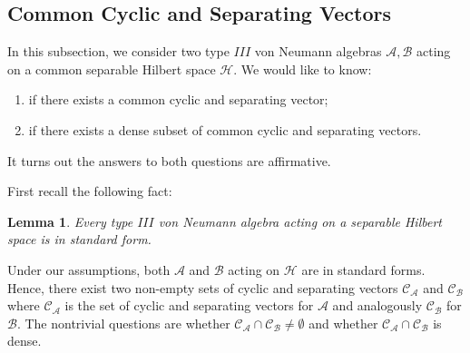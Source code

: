 \documentclass[a4paper,11pt]{article}
\newtheorem{lemma}[theorem]{Lemma}
\theoremstyle{definition}
\begin{document}
\subsection{Common Cyclic and Separating Vectors}\label{subsection:common}
In this subsection, we consider two type $III$ von Neumann algebras $\mathcal{A},\mathcal{B}$ acting on a common separable Hilbert space $\mathcal{H}$. We would like to know:
\begin{enumerate}
    \item if there exists a common cyclic and separating vector;
    \item if there exists a dense subset of common cyclic and separating vectors.
\end{enumerate}
It turns out the answers to both questions are affirmative.

First recall the following fact\cite{blackadar}:
\begin{lemma}\label{lemma:blackadar}
    Every type $III$ von Neumann algebra acting on a separable Hilbert space is in standard form.
\end{lemma}
Under our assumptions, both $\mathcal{A}$ and $\mathcal{B}$ acting on $\mathcal{H}$ are in standard forms. Hence, there exist two non-empty sets of cyclic and separating vectors $\mathcal{C}_\mathcal{A}$ and $\mathcal{C}_\mathcal{B}$ where $\mathcal{C}_\mathcal{A}$ is the set of cyclic and separating vectors for $\mathcal{A}$ and analogously $\mathcal{C}_\mathcal{B}$ for $\mathcal{B}$. The nontrivial questions are whether $\mathcal{C}_\mathcal{A}\cap\mathcal{C}_\mathcal{B} \neq\emptyset$ and whether $\mathcal{C}_\mathcal{A}\cap\mathcal{C}_\mathcal{B}$ is dense. 
\end{document}
